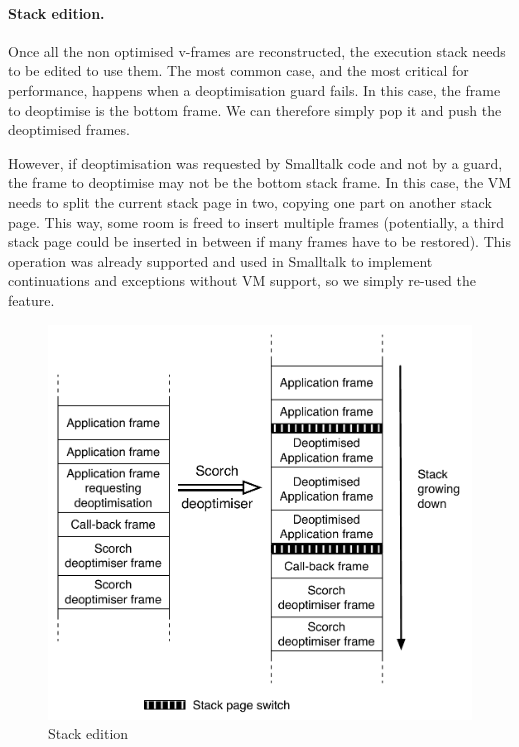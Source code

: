 \documentclass[a4paper,12pt,twoside]{../includes/ThesisStyle}
\begin{document}
\paragraph{Stack edition.}


Once all the non optimised v-frames are reconstructed, the execution stack needs to be edited to use them. The most common case, and the most critical for performance, happens when a deoptimisation guard fails. In this case, the frame to deoptimise is the bottom frame. We can therefore simply pop it and push the deoptimised frames.

However, if deoptimisation was requested by Smalltalk code and not by a guard, the frame to deoptimise may not be the bottom stack frame. In this case, the VM needs to split the current stack page in two, copying one part on another stack page. This way, some room is freed to insert multiple frames (potentially, a third stack page could be inserted in between if many frames have to be restored). This operation was already supported and used in Smalltalk to implement continuations and exceptions without VM support, so we simply re-used the feature.

\begin{figure}[h!]
    \begin{center}
		\includegraphics[width=0.80\linewidth]{DeoptStacks}
        \caption{Stack edition}
        \label{fig:DeoptStacks}
    \end{center}
\end{figure}
\end{document}
